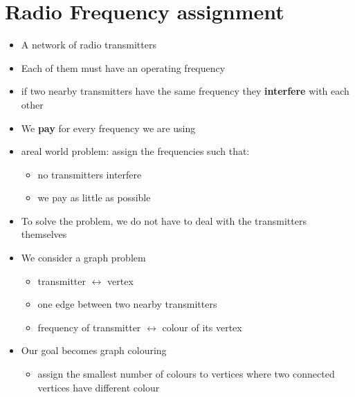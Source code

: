 \documentclass{article}[18pt]
\begin{document}
\section{Radio Frequency assignment}
\begin{itemize}
\item A network of radio transmitters
\item Each of them must have an operating frequency
\item if two nearby transmitters have the same frequency they \textbf{interfere} with each other
\item We \textbf{pay} for every frequency we are using
\item areal world problem: assign the frequencies such that:
\begin{itemize}
\item no transmitters interfere
\item we pay as little as possible
\end{itemize}
\end{itemize}
\begin{itemize}
\item To solve the problem, we do not have to deal with the transmitters themselves
\item We consider a graph problem
\begin{itemize}
\item transmitter $\leftrightarrow$ vertex
\item one edge between two nearby transmitters
\item frequency of transmitter $\leftrightarrow$ colour of its vertex
\end{itemize}
\item Our goal becomes graph colouring
\begin{itemize}
\item assign the smallest number of colours to vertices where two connected vertices have different colour
\end{itemize}
\end{itemize}
\end{document}
